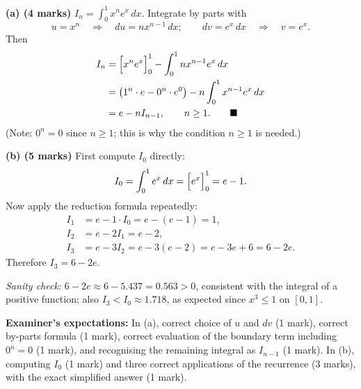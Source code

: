 \documentclass[11pt]{article}
\begin{document}
\begin{corrige}
\textbf{(a) (4 marks)} $I_n = \displaystyle\int_0^1 x^n e^x\,dx$. Integrate by parts with
\[
u = x^n \quad \Rightarrow \quad du = n x^{n-1}\,dx; \qquad dv = e^x\,dx \quad \Rightarrow \quad v = e^x.
\]
Then
\begin{align*}
I_n &= \Bigl[x^n e^x\Bigr]_0^1 - \int_0^1 n x^{n-1} e^x\,dx \\
&= \bigl(1^n \cdot e - 0^n \cdot e^0\bigr) - n\int_0^1 x^{n-1} e^x\,dx \\
&= e - n I_{n-1}, \qquad n \ge 1. \qquad \blacksquare
\end{align*}
(Note: $0^n = 0$ since $n \ge 1$; this is why the condition $n \ge 1$ is needed.)

\textbf{(b) (5 marks)} First compute $I_0$ directly:
\[
I_0 = \int_0^1 e^x\,dx = \Bigl[e^x\Bigr]_0^1 = e - 1.
\]
Now apply the reduction formula repeatedly:
\begin{align*}
I_1 &= e - 1\cdot I_0 = e - (e-1) = 1, \\
I_2 &= e - 2 I_1 = e - 2, \\
I_3 &= e - 3 I_2 = e - 3(e - 2) = e - 3e + 6 = 6 - 2e.
\end{align*}
Therefore $\boxed{I_3 = 6 - 2e}$.

\emph{Sanity check:} $6 - 2e \approx 6 - 5.437 = 0.563 > 0$, consistent with the integral of a positive function; also $I_3 < I_0 \approx 1.718$, as expected since $x^3 \le 1$ on $[0,1]$.

\textbf{Examiner's expectations:} In (a), correct choice of $u$ and $dv$ (1 mark), correct by-parts formula (1 mark), correct evaluation of the boundary term including $0^n = 0$ (1 mark), and recognising the remaining integral as $I_{n-1}$ (1 mark). In (b), computing $I_0$ (1 mark) and three correct applications of the recurrence (3 marks), with the exact simplified answer (1 mark).
\end{corrige}
\end{document}
